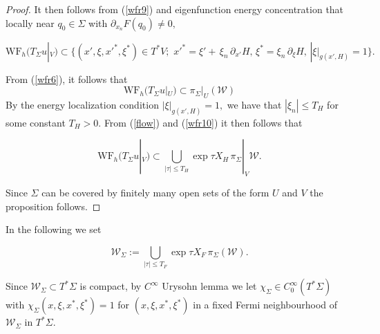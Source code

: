 \documentclass[11pt,reqno]{amsart}
\theoremstyle{definition}
\begin{document}
\begin{proof}
It then follows from (\ref{wfr9}) and eigenfunction energy concentration that locally near $q_0 \in \Sigma$ with $\partial_{x_n} F(q_0) \neq 0,$

\begin{equation} \label{wfr10}
\text{WF}_h (T_{\Sigma} u |_{V} ) \subset \big\{ (x',\xi, x'^*, \xi^*) \in T^* V ; \,\, x'^* = \xi' +  \, \xi_n \, \partial_{x'} H, \,  \xi^* =  \xi_n \, \partial_{\xi}H, \, |\xi |_{g(x',H)} = 1  \big\}.
\end{equation}

From (\ref{wfr6}), it follows that
$$ \text{WF}_h (T_{\Sigma} u |_{U} ) \subset \pi_{\Sigma} |_{U}({\mathcal W})$$
By the  energy localization condition $|\xi|_{g(x',H)}=1,$ we have that $|\xi_n| \leq T_{H}$ for some constant $T_H>0.$ From (\ref{flow}) and (\ref{wfr10}) it then follows that 


 $$\text{WF}_h (T_{\Sigma} u |_{V} ) \subset  \bigcup_{|\tau| \leq T_H} \exp \tau X_H \, \pi_{\Sigma}|_{V} {\mathcal W}.$$ 

Since $\Sigma$ can be covered by finitely many open sets of the form $U$ and $V$ the proposition follows.
\end{proof}

In the following we set 

\begin{equation} \label{W2}
{\mathcal W}_{\Sigma} :=  \bigcup_{|\tau| \leq T_F} \exp \tau X_F \, \pi_{\Sigma} ({\mathcal W}).
\end{equation}


Since ${\mathcal W}_{\Sigma} \subset T^* \Sigma $ is compact, by $C^{\infty}$ Urysohn lemma we let $\chi_{\Sigma} \in C^{\infty}_0(T^*\Sigma)$ with $\chi_{\Sigma} (x,\xi,x^*,\xi^*) = 1 $ for $(x,\xi,x^*,\xi^*)$ in a fixed Fermi neighbourhood of ${\mathcal W}_\Sigma$ in $T^*\Sigma.$
\end{document}

